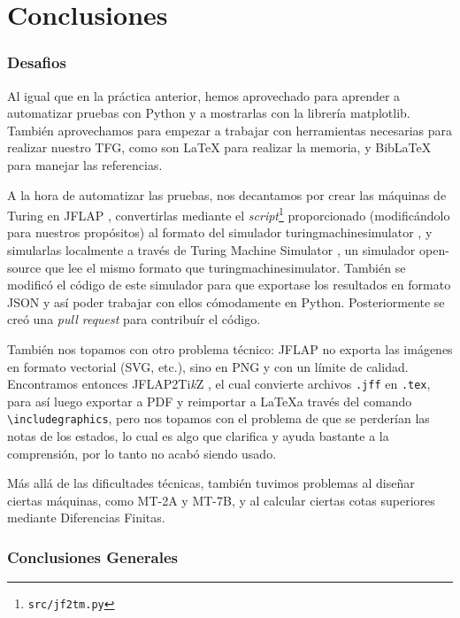\part{Conclusiones}

\section{Desafios}
Al igual que en la práctica anterior, hemos aprovechado para aprender a automatizar pruebas con Python y a mostrarlas con la librería matplotlib\supercite{matplotlib}. También aprovechamos para empezar a trabajar con herramientas necesarias para realizar nuestro TFG, como son \LaTeX \supercite{latex} para realizar la memoria, y BibLaTeX \supercite{biblatex} para manejar las referencias.\medskip

A la hora de automatizar las pruebas, nos decantamos por crear las máquinas de Turing en JFLAP \supercite{jflap}, convertirlas mediante el \textit{script}\footnote{\texttt{src/jf2tm.py}} proporcionado (modificándolo para nuestros propósitos) al formato del simulador turingmachinesimulator \supercite{turingmachinesimulator}, y simularlas localmente a través de Turing Machine Simulator \supercite{tmsimulator}, un simulador open-source que lee el mismo formato que turingmachinesimulator. También se modificó el código de este simulador para que exportase los resultados en formato JSON y así poder trabajar con ellos cómodamente en Python. Posteriormente se creó una \textit{pull request} para contribuír el código.\medskip

También nos topamos con otro problema técnico: JFLAP \supercite{jflap} no exporta las imágenes en formato vectorial (SVG, etc.), sino en PNG y con un límite de calidad.\\
Encontramos entonces JFLAP2Ti\textit{k}Z \supercite{jflap2tikz}, el cual convierte archivos \texttt{.jff} en \texttt{.tex}, para así luego exportar a PDF y reimportar a \LaTeX a través del comando \verb|\includegraphics|, pero nos topamos con el problema de que se perderían las notas de los estados, lo cual es algo que clarifica y ayuda bastante a la comprensión, por lo tanto no acabó siendo usado.\medbreak

Más allá de las dificultades técnicas, también tuvimos problemas al diseñar ciertas máquinas, como MT-2A y MT-7B, y al calcular ciertas cotas superiores mediante Diferencias Finitas.


\section{Conclusiones Generales}

